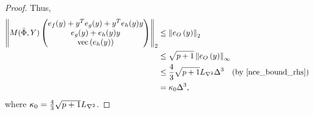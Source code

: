 \documentclass{article}
\newcommand{\matvec}{\mathrm{vec}}
\begin{document}
\begin{proof}
Thus,
\begin{align}\label{err_bnd1}
\left\|M(\bar \Phi,Y)
\begin{pmatrix}
e_f(y) + y^Te_g(y) + y^Te_h(y) y \\
e_g(y) + e_h(y) y \\ 
\matvec\left(e_h(y)\right)
\end{pmatrix}\right\|_2
&\le \left\|e_O\left(y\right)\right\|_2 \\ \nonumber
&\le \sqrt{p+1} \left\|e_O\left(y\right)\right\|_{\infty} \\ \nonumber
&\le
\frac 4 3 \sqrt{p+1} L_{\nabla^2} \Delta^3 \quad \mbox{(by \cref{nce_bound_rhs})}\\ \nonumber
&= \kappa_0 \Delta^3,
\end{align}
where $\kappa_0 = \frac 4 3 \sqrt{p+1}{L_{\nabla^2}}$.


\end{proof}
\end{document}
